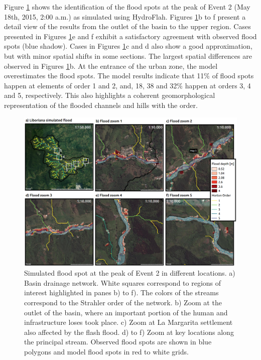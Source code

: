 \documentclass[hess, manuscript]{copernicus}
\begin{document}
Figure \ref{fig:SimFloodSpots} shows the identification of the flood spots at the peak of Event 2 (May 18th, 2015, 2:00 a.m.) as simulated using HydroFlah. Figures \ref{fig:SimFloodSpots}b to f present a detail view of the results from the outlet of the basin to the upper region.  Cases presented in Figures \ref{fig:SimFloodSpots}e and f exhibit a satisfactory agreement with observed flood spots (blue shadow).  Cases in Figures \ref{fig:SimFloodSpots}c and d also show a good approximation, but with minor spatial shifts in some sections. The largest spatial differences are observed in Figures \ref{fig:SimFloodSpots}b. At the entrance of the urban zone, the model overestimates the flood spots.  The model results indicate that 11\% of flood spots happen at elements of order 1 and 2,  and, 18, 38 and 32\% happen at orders 3, 4 and 5, respectively.  This also highlights a coherent geomorphological representation of the flooded channels and hills with the order.\\   

\begin{figure}[t!]
\centering
 \includegraphics[width=12cm]{Figures/Manchas2.png}
 \caption{Simulated flood spot at the peak of Event 2 in different locations. a) Basin drainage network. White squares correspond to regions of interest highlighted in panes b) to f). The colors of the streams correspond to the Strahler order of the network. b) Zoom at the outlet of the basin, where an important portion of the human and infrastructure loses took place. c) Zoom at La Margarita settlement also affected by the flash flood. d) to f) Zoom at key locations along the principal stream.  Observed flood spots are shown in blue polygons and model flood spots in red to white grids.}
    \label{fig:SimFloodSpots}
\end{figure}
\end{document}
